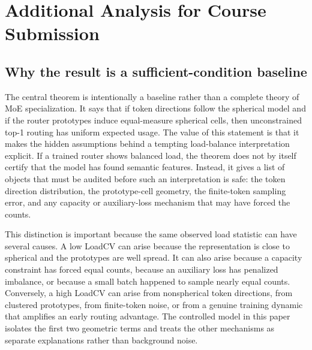 \section{Additional Analysis for Course Submission}

\subsection{Why the result is a sufficient-condition baseline}

The central theorem is intentionally a baseline rather than a complete theory
of MoE specialization. It says that if token directions follow the spherical
model and if the router prototypes induce equal-measure spherical cells, then
unconstrained top-1 routing has uniform expected usage. The value of this
statement is that it makes the hidden assumptions behind a tempting load-balance
interpretation explicit. If a trained router shows balanced load, the theorem
does not by itself certify that the model has found semantic features. Instead,
it gives a list of objects that must be audited before such an interpretation is
safe: the token direction distribution, the prototype-cell geometry, the
finite-token sampling error, and any capacity or auxiliary-loss mechanism that
may have forced the counts.

This distinction is important because the same observed load statistic can have
several causes. A low LoadCV can arise because the representation is close to
spherical and the prototypes are well spread. It can also arise because a
capacity constraint has forced equal counts, because an auxiliary loss has
penalized imbalance, or because a small batch happened to sample nearly equal
counts. Conversely, a high LoadCV can arise from nonspherical token directions,
from clustered prototypes, from finite-token noise, or from a genuine training
dynamic that amplifies an early routing advantage. The controlled model in this
paper isolates the first two geometric terms and treats the other mechanisms as
separate explanations rather than background noise.

